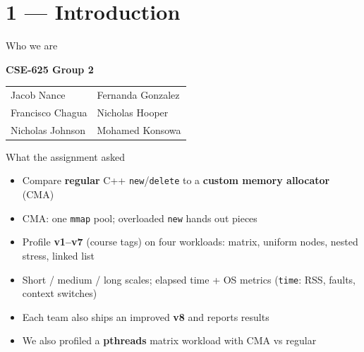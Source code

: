 \section{1 --- Introduction}

\begin{frame}{Who we are}
    \begin{center}
    {\large\textbf{CSE-625 Group 2}}

    \vspace{0.8em}
    \begin{tabular}{ll}
        Jacob Nance & Fernanda Gonzalez \\
        Francisco Chagua & Nicholas Hooper \\
        Nicholas Johnson & Mohamed Konsowa \\
    \end{tabular}
    \end{center}
\end{frame}

\begin{frame}{What the assignment asked}
    \begin{itemize}
        \item Compare \textbf{regular} C++ \texttt{new}/\texttt{delete} to a
              \textbf{custom memory allocator} (CMA)
        \item CMA: one \texttt{mmap} pool; overloaded \texttt{new} hands out pieces
        \item Profile \textbf{v1--v7} (course tags) on four workloads:
              matrix, uniform nodes, nested stress, linked list
        \item Short / medium / long scales; elapsed time + OS metrics
              (\texttt{time}: RSS, faults, context switches)
        \item Each team also ships an improved \textbf{v8} and reports results
        \item We also profiled a \textbf{pthreads} matrix workload with CMA vs regular
    \end{itemize}
\end{frame}
